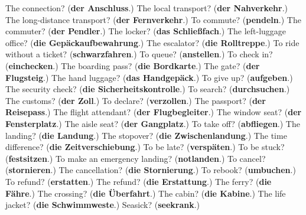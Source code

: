 \begin{tcolorbox}[breakable,colback=teal!4,colframe=teal!35!black,title={Before you move on}]
The connection? (\textbf{der Anschluss}.) The local transport? (\textbf{der Nahverkehr}.) The long-distance transport? (\textbf{der Fernverkehr}.) To commute? (\textbf{pendeln}.) The commuter? (\textbf{der Pendler}.) The locker? (\textbf{das Schließfach}.) The left-luggage office? (\textbf{die Gepäckaufbewahrung}.) The escalator? (\textbf{die Rolltreppe}.) To ride without a ticket? (\textbf{schwarzfahren}.) To queue? (\textbf{anstellen}.) To check in? (\textbf{einchecken}.) The boarding pass? (\textbf{die Bordkarte}.) The gate? (\textbf{der Flugsteig}.) The hand luggage? (\textbf{das Handgepäck}.) To give up? (\textbf{aufgeben}.) The security check? (\textbf{die Sicherheitskontrolle}.) To search? (\textbf{durchsuchen}.) The customs? (\textbf{der Zoll}.) To declare? (\textbf{verzollen}.) The passport? (\textbf{der Reisepass}.) The flight attendant? (\textbf{der Flugbegleiter}.) The window seat? (\textbf{der Fensterplatz}.) The aisle seat? (\textbf{der Gangplatz}.) To take off? (\textbf{abfliegen}.) The landing? (\textbf{die Landung}.) The stopover? (\textbf{die Zwischenlandung}.) The time difference? (\textbf{die Zeitverschiebung}.) To be late? (\textbf{verspäten}.) To be stuck? (\textbf{festsitzen}.) To make an emergency landing? (\textbf{notlanden}.) To cancel? (\textbf{stornieren}.) The cancellation? (\textbf{die Stornierung}.) To rebook? (\textbf{umbuchen}.) To refund? (\textbf{erstatten}.) The refund? (\textbf{die Erstattung}.) The ferry? (\textbf{die Fähre}.) The crossing? (\textbf{die Überfahrt}.) The cabin? (\textbf{die Kabine}.) The life jacket? (\textbf{die Schwimmweste}.) Seasick? (\textbf{seekrank}.)
\end{tcolorbox}
